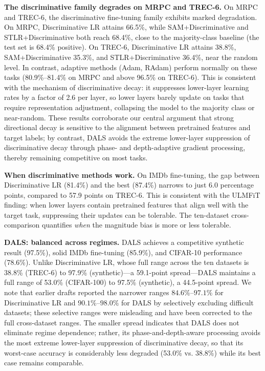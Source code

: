\documentclass[a4paper,fleqn]{cas-dc}
\begin{document}
\textbf{The discriminative family degrades on MRPC and TREC-6.} On MRPC and TREC-6, the discriminative fine-tuning family exhibits marked degradation. On MRPC, Discriminative LR attains 66.5\%, while SAM+Discriminative and STLR+Discriminative both reach 68.4\%, close to the majority-class baseline (the test set is 68.4\% positive). On TREC-6, Discriminative LR attains 38.8\%, SAM+Discriminative 35.3\%, and STLR+Discriminative 36.4\%, near the random level. In contrast, adaptive methods (Adam, RAdam) perform normally on these tasks (80.9\%--81.4\% on MRPC and above 96.5\% on TREC-6). This is consistent with the mechanism of discriminative decay: it suppresses lower-layer learning rates by a factor of 2.6 per layer, so lower layers barely update on tasks that require representation adjustment, collapsing the model to the majority class or near-random. These results corroborate our central argument that strong directional decay is sensitive to the alignment between pretrained features and target labels; by contrast, DALS avoids the extreme lower-layer suppression of discriminative decay through phase- and depth-adaptive gradient processing, thereby remaining competitive on most tasks.

\textbf{When discriminative methods work.} On IMDb fine-tuning, the gap between Discriminative LR (81.4\%) and the best (87.4\%) narrows to just 6.0 percentage points, compared to 57.9 points on TREC-6. This is consistent with the ULMFiT finding: when lower layers contain pretrained features that align well with the target task, suppressing their updates can be tolerable. The ten-dataset cross-comparison quantifies \emph{when} the magnitude bias is more or less tolerable.

\textbf{DALS: balanced across regimes.} DALS achieves a competitive synthetic result (97.5\%), solid IMDb fine-tuning (85.9\%), and CIFAR-10 performance (78.6\%). Unlike Discriminative LR, whose full range across the ten datasets is 38.8\% (TREC-6) to 97.9\% (synthetic)---a 59.1-point spread---DALS maintains a full range of 53.0\% (CIFAR-100) to 97.5\% (synthetic), a 44.5-point spread. We note that earlier drafts reported the narrower ranges $84.6\%$--$97.1\%$ for Discriminative LR and $90.1\%$--$98.0\%$ for DALS by selectively excluding difficult datasets; these selective ranges were misleading and have been corrected to the full cross-dataset ranges. The smaller spread indicates that DALS does not eliminate regime dependence; rather, its phase-and-depth-aware processing avoids the most extreme lower-layer suppression of discriminative decay, so that its worst-case accuracy is considerably less degraded (53.0\% vs. 38.8\%) while its best case remains comparable.
\end{document}
